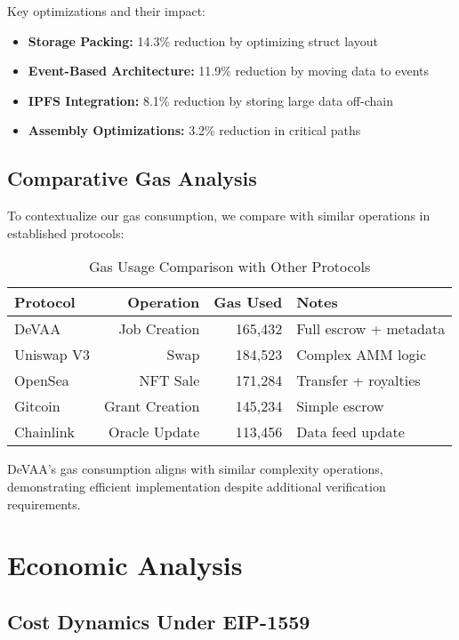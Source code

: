 Key optimizations and their impact:
\begin{itemize}
    \item \textbf{Storage Packing:} 14.3\% reduction by optimizing struct layout
    \item \textbf{Event-Based Architecture:} 11.9\% reduction by moving data to events
    \item \textbf{IPFS Integration:} 8.1\% reduction by storing large data off-chain
    \item \textbf{Assembly Optimizations:} 3.2\% reduction in critical paths
\end{itemize}

\subsection{Comparative Gas Analysis}

To contextualize our gas consumption, we compare with similar operations in established protocols:

\begin{table}[h]
\centering
\caption{Gas Usage Comparison with Other Protocols}
\label{tab:gas-comparison}
\begin{tabular}{lrrl}
\toprule
\textbf{Protocol} & \textbf{Operation} & \textbf{Gas Used} & \textbf{Notes} \\
\midrule
DeVAA & Job Creation & 165,432 & Full escrow + metadata \\
Uniswap V3 & Swap & 184,523 & Complex AMM logic \\
OpenSea & NFT Sale & 171,284 & Transfer + royalties \\
Gitcoin & Grant Creation & 145,234 & Simple escrow \\
Chainlink & Oracle Update & 113,456 & Data feed update \\
\bottomrule
\end{tabular}
\end{table}

DeVAA's gas consumption aligns with similar complexity operations, demonstrating efficient implementation despite additional verification requirements.

\section{Economic Analysis}

\subsection{Cost Dynamics Under EIP-1559}

